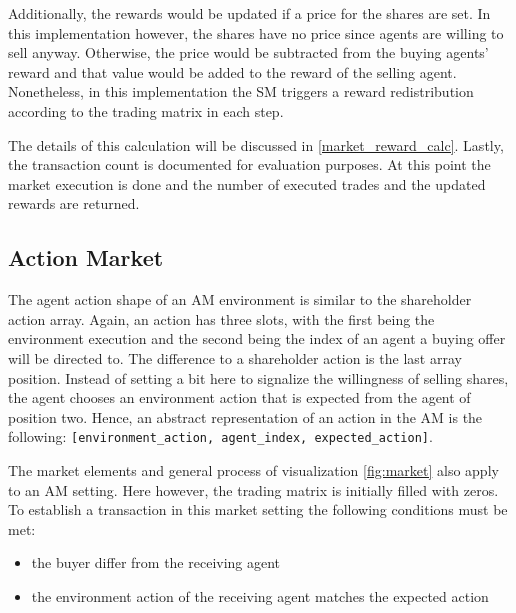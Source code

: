 Additionally, the rewards would be updated if a price for the shares are set. In this implementation however, the shares have no price since agents are willing to sell anyway. Otherwise, the price would be subtracted from the buying agents' reward and that value would be added to the reward of the selling agent. Nonetheless, in this implementation the SM triggers a reward redistribution according to the trading matrix in each step. 

The details of this calculation will be discussed in \ref{market_reward_calc}.
Lastly, the transaction count is documented for evaluation purposes. At this point the market execution is done and the number of executed trades and the updated rewards are returned.

\subsection{Action Market}
The agent action shape of an AM environment is similar to the shareholder action array. Again, an action has three slots, with the first being the environment execution and the second being the index of an agent a buying offer will be directed to. The difference to a shareholder action is the last array position. Instead of setting a bit here to signalize the willingness of selling shares, the agent chooses an environment action that is expected from the agent of position two. Hence, an abstract representation of an action in the AM is the following: \verb|[environment_action, agent_index, expected_action]|.

The market elements and general process of visualization \ref{fig:market} also apply to an AM setting. Here however, the trading matrix is initially filled with zeros. 
To establish a transaction in this market setting the following conditions must be met:
\begin{itemize}
    \item the buyer differ from the receiving agent
    \item the environment action of the receiving agent matches the expected action
\end{itemize}

